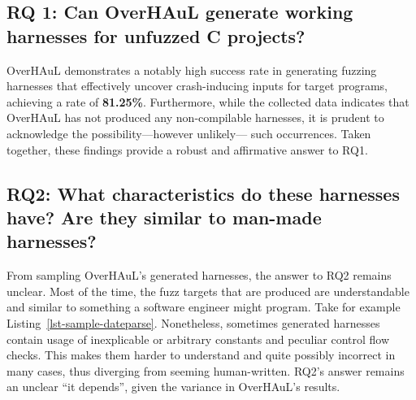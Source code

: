 \documentclass[
  a4paper,
]{scrreprt}
\theoremstyle{definition}
\theoremstyle{remark}
\begin{document}
\subsection{RQ 1: Can OverHAuL generate working harnesses for unfuzzed C
projects?}\label{rq-1-can-overhaul-generate-working-harnesses-for-unfuzzed-c-projects}

OverHAuL demonstrates a notably high success rate in generating fuzzing
harnesses that effectively uncover crash-inducing inputs for target
programs, achieving a rate of \textbf{81.25\%}. Furthermore, while the
collected data indicates that OverHAuL has not produced any
non-compilable harnesses, it is prudent to acknowledge the
possibility---however unlikely--- such occurrences. Taken together,
these findings provide a robust and affirmative answer to RQ1.

\subsection{RQ2: What characteristics do these harnesses have? Are they
similar to man-made
harnesses?}\label{rq2-what-characteristics-do-these-harnesses-have-are-they-similar-to-man-made-harnesses}

From sampling OverHAuL's generated harnesses, the answer to RQ2 remains
unclear. Most of the time, the fuzz targets that are produced are
understandable and similar to something a software engineer might
program. Take for example Listing~\ref{lst-sample-dateparse}.
Nonetheless, sometimes generated harnesses contain usage of inexplicable
or arbitrary constants and peculiar control flow checks. This makes them
harder to understand and quite possibly incorrect in many cases, thus
diverging from seeming human-written. RQ2's answer remains an unclear
``it depends'', given the variance in OverHAuL's results.
\end{document}
